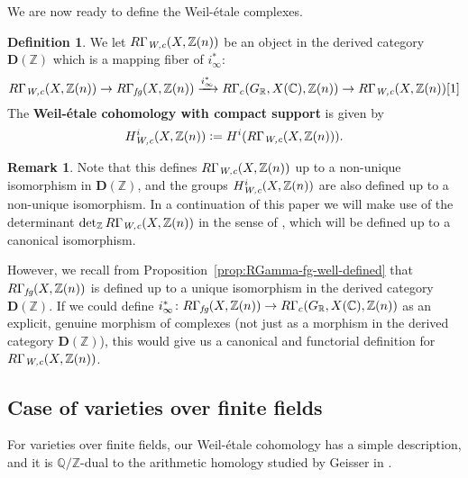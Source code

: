\documentclass[leqno,12pt]{article}
\theoremstyle{plain}
\theoremstyle{definition}
\newtheorem{definition}[theorem]{\indent\sc Definition}
\newtheorem{remark}[theorem]{\indent\sc Remark}
\newcommand{\CC}{\mathbb{C}}
\newcommand{\QQ}{\mathbb{Q}}
\newcommand{\RR}{\mathbb{R}}
\newcommand{\ZZ}{\mathbb{Z}}
\newcommand{\dfn}{\mathrel{\mathop:}=}
\newcommand{\Wc}{\text{\it W,c}}
\newcommand{\fg}{\text{\it fg}}
\newcommand{\DZ}{{\mathbf{D} (\ZZ)}}
\begin{document}
We are now ready to define the Weil-\'{e}tale complexes.

\begin{definition}
  \label{dfn:RGammaWc}
  We let
  $R\Gamma_\Wc (X,\ZZ(n))$ be an object in the derived category
  $\DZ$ which is a mapping fiber of $i_\infty^*$:
  \[ R\Gamma_\Wc (X,\ZZ(n)) \to
  R\Gamma_\fg (X, \ZZ (n)) \xrightarrow{i_\infty^*}
  R\Gamma_c (G_\RR, X (\CC), \ZZ (n)) \to
  R\Gamma_\Wc (X,\ZZ(n)) [1] \]
  The \textbf{Weil-\'{e}tale cohomology with compact support} is given by
  $$H_\Wc^i (X, \ZZ (n)) \dfn H^i (R\Gamma_\Wc (X,\ZZ(n))).$$
\end{definition}

\begin{remark}
  Note that this defines $R\Gamma_\Wc (X,\ZZ(n))$ up to a non-unique isomorphism
  in $\DZ$, and the groups $H_\Wc^i (X, \ZZ (n))$ are also defined
  up to a non-unique isomorphism. In a continuation of this paper we will make
  use of the determinant $\det\nolimits_\ZZ R\Gamma_\Wc (X,\ZZ(n))$ in the
  sense of \cite{Knudsen-Mumford-1976}, which will be defined up to a canonical
  isomorphism.

  However, we recall from Proposition~\ref{prop:RGamma-fg-well-defined} that
  $R\Gamma_\fg (X, \ZZ (n))$ is defined up to a unique isomorphism in the
  derived category $\DZ$. If we could define
  $i_\infty^*\colon R\Gamma_\fg (X, \ZZ(n)) \to R\Gamma_c (G_\RR, X(\CC),
  \ZZ(n))$ as an explicit, genuine morphism of complexes (not just as a morphism
  in the derived category $\DZ$), this would give us a canonical and functorial
  definition for $R\Gamma_\Wc (X, \ZZ(n))$.
\end{remark}

\subsection*{Case of varieties over finite fields}

For varieties over finite fields, our Weil-\'{e}tale cohomology has a simple
description, and it is $\QQ/\ZZ$-dual to the arithmetic homology studied by
Geisser in \cite{Geisser-2010-arithmetic-homology}.
\end{document}
